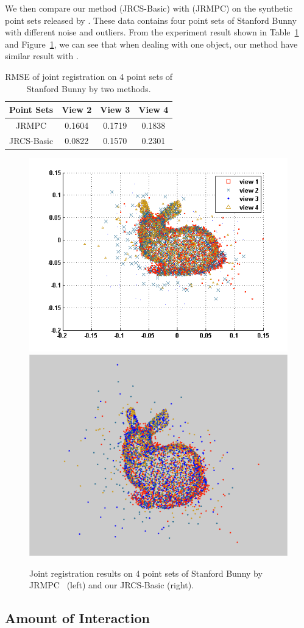 We then compare our method (JRCS-Basic) with \cite{Evangelidis2014}(JRMPC) on the synthetic point sets released by \cite{Evangelidis2014}. These data contains four point sets of Stanford Bunny with different noise and outliers. From the experiment result shown in Table~\ref{tab:reg} and Figure~\ref{fig:reg}, we can see that when dealing with one object, our method have similar result with \cite{Evangelidis2014}.

\begin{table}
	\centering
	\caption{RMSE of joint registration on 4 point sets of Stanford Bunny by two methods.}
	\begin{tabular}{c c c c}
		Point Sets& View 2 & View 3 & View 4 \\
		\hline
		JRMPC & 0.1604 & 0.1719 & 0.1838\\   
		JRCS-Basic & 0.0822 &  0.1570  & 0.2301\\
	\end{tabular}
	\label{tab:reg}
\end{table}
\begin{figure}[htb]
	\centering
	\includegraphics[width=0.4\linewidth]{images/exp/JRMPC.png}
	\includegraphics[width=0.4\linewidth]{images/exp/JRCSReg.png}
	\caption{Joint registration results on 4 point sets of Stanford Bunny by JRMPC~\cite{Evangelidis2014} (left) and our JRCS-Basic (right).}
	\label{fig:reg}
\end{figure}

\subsection{Amount of Interaction}
\label{subsec:interact}

